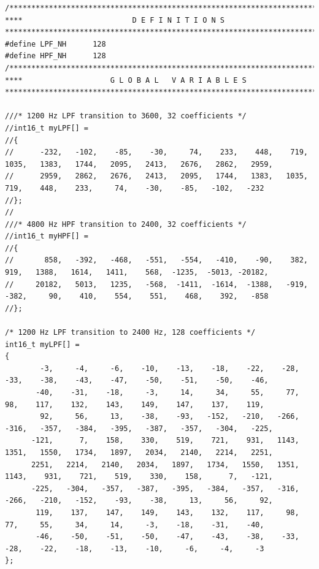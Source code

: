 \documentclass[11pt,pdftex,portrait,letterpaper]{article}
\begin{document}
\begin{lstlisting}[caption={filters.h}, label=l:program5]
/*******************************************************************************
****                         D E F I N I T I O N S
*******************************************************************************/
#define LPF_NH		128
#define HPF_NH		128
/*******************************************************************************
****                    G L O B A L   V A R I A B L E S
*******************************************************************************/

///* 1200 Hz LPF transition to 3600, 32 coefficients */
//int16_t myLPF[] =
//{
//      -232,   -102,    -85,    -30,     74,    233,    448,    719,   1035,   1383,   1744,   2095,   2413,   2676,   2862,   2959,
//      2959,   2862,   2676,   2413,   2095,   1744,   1383,   1035,    719,    448,    233,     74,    -30,    -85,   -102,   -232
//};
//
///* 4800 Hz HPF transition to 2400, 32 coefficients */
//int16_t myHPF[] =
//{
//       858,   -392,   -468,   -551,   -554,   -410,    -90,    382,    919,   1388,   1614,   1411,    568,  -1235,  -5013, -20182,
//     20182,   5013,   1235,   -568,  -1411,  -1614,  -1388,   -919,   -382,     90,    410,    554,    551,    468,    392,   -858
//};

/* 1200 Hz LPF transition to 2400 Hz, 128 coefficients */
int16_t myLPF[] =
{
        -3,     -4,     -6,    -10,    -13,    -18,    -22,    -28,    -33,    -38,    -43,    -47,    -50,    -51,    -50,    -46,
       -40,    -31,    -18,     -3,     14,     34,     55,     77,     98,    117,    132,    143,    149,    147,    137,    119,
        92,     56,     13,    -38,    -93,   -152,   -210,   -266,   -316,   -357,   -384,   -395,   -387,   -357,   -304,   -225,
      -121,      7,    158,    330,    519,    721,    931,   1143,   1351,   1550,   1734,   1897,   2034,   2140,   2214,   2251,
      2251,   2214,   2140,   2034,   1897,   1734,   1550,   1351,   1143,    931,    721,    519,    330,    158,      7,   -121,
      -225,   -304,   -357,   -387,   -395,   -384,   -357,   -316,   -266,   -210,   -152,    -93,    -38,     13,     56,     92,
       119,    137,    147,    149,    143,    132,    117,     98,     77,     55,     34,     14,     -3,    -18,    -31,    -40,
       -46,    -50,    -51,    -50,    -47,    -43,    -38,    -33,    -28,    -22,    -18,    -13,    -10,     -6,     -4,     -3
};


\end{lstlisting}
\end{document}
